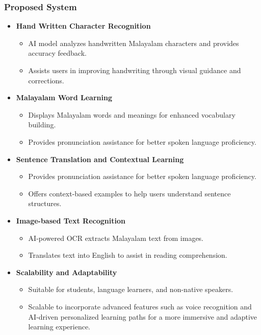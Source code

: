\documentclass[aspectratio=169]{beamer}
\begin{document}
\begin{frame}
    \frametitle{Proposed System}
    \begin{itemize}
      \item \textbf{Hand Written Character Recognition}  
        \begin{itemize}
            \item AI model analyzes handwritten Malayalam characters and provides accuracy feedback.
            \item Assists users in improving handwriting through visual guidance and corrections.
        \end{itemize}

        \item \textbf{Malayalam Word Learning }
        \begin{itemize}
            \item Displays Malayalam words and meanings for enhanced vocabulary building.
            \item Provides pronunciation assistance for better spoken language proficiency.
        \end{itemize}

        \item \textbf{Sentence Translation and Contextual Learning}  
        \begin{itemize}
            \item Provides pronunciation assistance for better spoken language proficiency.
            \item Offers context-based examples to help users understand sentence structures.
        \end{itemize}
        \item \textbf{Image-based Text Recognition}  
        \begin{itemize}
            \item AI-powered OCR extracts Malayalam text from images.
            \item Translates text into English to assist in reading comprehension.
        \end{itemize}
        \item \textbf{Scalability and Adaptability}  
        \begin{itemize}
            \item Suitable for students, language learners, and non-native speakers.
            \item Scalable to incorporate advanced features such as voice recognition and AI-driven personalized learning paths for a more immersive and adaptive learning experience.
        \end{itemize}
        
            
    \end{itemize}
\end{frame}
\end{document}
